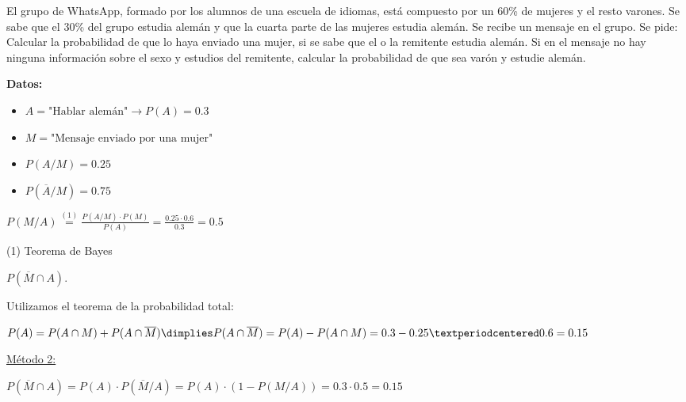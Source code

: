 \documentclass[palatino,nosec,nochap,nobuilddate]{Docencia}
\begin{document}
\begin{problem}
El grupo de WhatsApp, formado por los alumnos de una escuela de idiomas, está compuesto por un 60\% de mujeres y el resto varones. Se sabe que el 30\% del grupo estudia alemán y que la cuarta parte de las mujeres estudia alemán. Se recibe un mensaje en el grupo. Se pide:
\ppart Calcular la probabilidad de que lo haya enviado una mujer, si se sabe que el o la remitente estudia alemán.
\ppart	Si en el mensaje no hay ninguna información sobre el sexo y estudios del remitente, calcular la probabilidad de que sea varón y estudie alemán.

\solution

\textbf{Datos:}
\begin{itemize}
	\item $A = \text{"Hablar alemán"} \to P(A) = 0.3$
	\item $M = \text{"Mensaje enviado por una mujer"}$
	\item $P(A/M) = 0.25$
	\item $P(\overline{A}/M) = 0.75$
\end{itemize}

\spart $P(M/A) \overset{(1)}{=} \frac{P(A/M)·P(M)}{P(A)} = \frac{0.25·0.6}{0.3} = 0.5 $

(1) Teorema de Bayes

\spart $P(\overline{M}\cap A)$.

Utilizamos el teorema de la probabilidad total: 

$P(A) = P(A\cap M) + P(A\cap\overline{M}) \dimplies P(A\cap\overline{M}) = P(A) - P(A\cap M) = 0.3 - 0.25·0.6 = 0.15$

\ul{Método 2:}

$P(\overline{M}\cap A) = P(A)·P(\overline{M}/A) = P(A)·(1-P(M/A)) = 0.3·0.5 = 0.15$

\end{problem}
\end{document}

